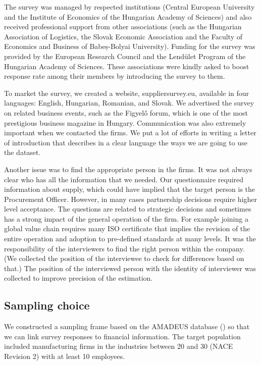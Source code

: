 \documentclass[final, dvipsnames, authoryear,12pt]{elsarticle}
\begin{document}
The survey was managed by respected institutions (Central European University and the Institute of Economics of the Hungarian Academy of Sciences) and also received professional support from other associations (such as the Hungarian Association of Logistics, the Slovak Economic Association and the Faculty of Economics and Business of Babeș-Bolyai University). Funding for the survey was provided by the European Research Council and the Lendület Program of the Hungarian Academy of Sciences. These associations were kindly asked to boost response rate among their members by introducing the survey to them.

To market the survey, we created a website, suppliersurvey.eu, available in four languages: English, Hungarian, Romanian, and Slovak. We advertised the survey on related business events, such as the Figyelő forum, which is one of the most prestigious business magazine in Hungary. Communication was also extremely important when we contacted the firms. We put a lot of efforts in writing a letter of introduction that describes in a clear language the ways we are going to use the dataset.

Another issue was to find the appropriate person in the firms. It was not always clear who has all the information that we needed. Our questionnaire required information about supply, which could have implied that the target person is the Procurement Officer. However, in many cases partnership decisions require higher level acceptance. The questions are related to strategic decisions and sometimes has a strong impact of the general operation of the firm. For example joining a global value chain requires many ISO certificate that implies the revision of the entire operation and adoption to pre-defined standards at many levels. It was the responsibility of the interviewers to find the right person within the company. (We collected the position of the interviewee to check for differences based on that.) The position of the interviewed person with the identity of interviewer was collected to improve precision of the estimation.

\subsection{Sampling choice}
We constructed a sampling frame based on the AMADEUS database (\cite{amadeus}) so that we can link survey responses to financial information. The target population included manufacturing firms in the industries between 20 and 30 (NACE Revision 2) with at least 10 employees.
\end{document}
